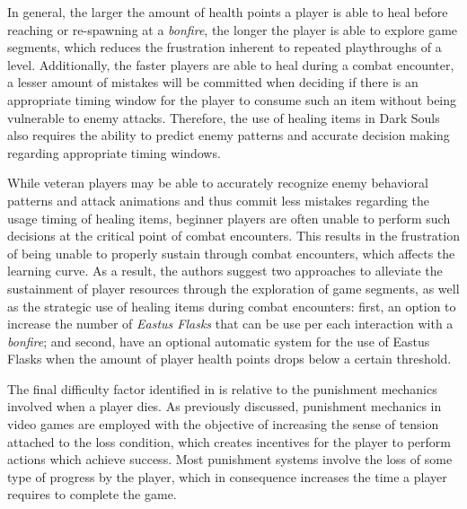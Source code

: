 In general, the larger the amount of health points a player is able to heal before reaching or re-spawning at a \emph{bonfire}, the longer the player is able to explore game segments, which reduces the frustration inherent to repeated playthroughs of a level. Additionally, the faster players are able to heal during a combat encounter, a lesser amount of mistakes will be committed when deciding if there is an appropriate timing window for the player to consume such an item without being vulnerable to enemy attacks. Therefore, the use of healing items in Dark Souls also requires the ability to predict enemy patterns and accurate decision making regarding appropriate timing windows.

While veteran players may be able to accurately recognize enemy behavioral patterns and attack animations and thus commit less mistakes regarding the usage timing of healing items, beginner players are often unable to perform such decisions at the critical point of combat encounters. This results in the frustration of being unable to properly sustain through combat encounters, which affects the learning curve. As a result, the authors suggest two approaches to alleviate the sustainment of player resources through the exploration of game segments, as well as the strategic use of healing items during combat encounters: first, an option to increase the number of \emph{Eastus Flasks} that can be use per each interaction with a \emph{bonfire}; and second, have an optional automatic system for the use of Eastus Flasks when the amount of player health points drops below a certain threshold.

The final difficulty factor identified in \citet{ONLINE_ApproachabilityFixDarkSouls} is relative to the punishment mechanics involved when a player dies. As previously discussed, punishment mechanics in video games are employed with the objective of increasing the sense of tension attached to the loss condition, which creates incentives for the player to perform actions which achieve success. Most punishment systems involve the loss of some type of progress by the player, which in consequence increases the time a player requires to complete the game.

